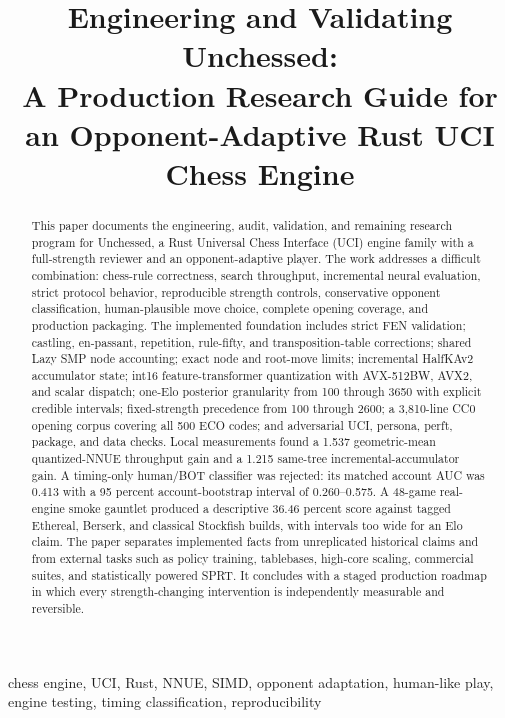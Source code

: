 \documentclass[conference]{IEEEtranSSP}
\title{Engineering and Validating Unchessed:\\
A Production Research Guide for an Opponent-Adaptive Rust UCI Chess Engine}
\author{
\IEEEauthorblockN{Unchessed AI Project}
\IEEEauthorblockA{Arena.ai Agent Mode\\
Singapore\\
Repository: \url{https://github.com/Amoguslittleahhh/Unchessed-UCI-Engine}}
}
\begin{document}
\maketitle

\begin{abstract}
This paper documents the engineering, audit, validation, and remaining research program for Unchessed, a Rust Universal Chess Interface (UCI) engine family with a full-strength reviewer and an opponent-adaptive player. The work addresses a difficult combination: chess-rule correctness, search throughput, incremental neural evaluation, strict protocol behavior, reproducible strength controls, conservative opponent classification, human-plausible move choice, complete opening coverage, and production packaging. The implemented foundation includes strict FEN validation; castling, en-passant, repetition, rule-fifty, and transposition-table corrections; shared Lazy SMP node accounting; exact node and root-move limits; incremental HalfKAv2 accumulator state; int16 feature-transformer quantization with AVX-512BW, AVX2, and scalar dispatch; one-Elo posterior granularity from 100 through 3650 with explicit credible intervals; fixed-strength precedence from 100 through 2600; a 3,810-line CC0 opening corpus covering all 500 ECO codes; and adversarial UCI, persona, perft, package, and data checks. Local measurements found a 1.537 geometric-mean quantized-NNUE throughput gain and a 1.215 same-tree incremental-accumulator gain. A timing-only human/BOT classifier was rejected: its matched account AUC was 0.413 with a 95 percent account-bootstrap interval of 0.260--0.575. A 48-game real-engine smoke gauntlet produced a descriptive 36.46 percent score against tagged Ethereal, Berserk, and classical Stockfish builds, with intervals too wide for an Elo claim. The paper separates implemented facts from unreplicated historical claims and from external tasks such as policy training, tablebases, high-core scaling, commercial suites, and statistically powered SPRT. It concludes with a staged production roadmap in which every strength-changing intervention is independently measurable and reversible.
\end{abstract}

\begin{IEEEkeywords}
chess engine, UCI, Rust, NNUE, SIMD, opponent adaptation, human-like play, engine testing, timing classification, reproducibility
\end{IEEEkeywords}
\end{document}
